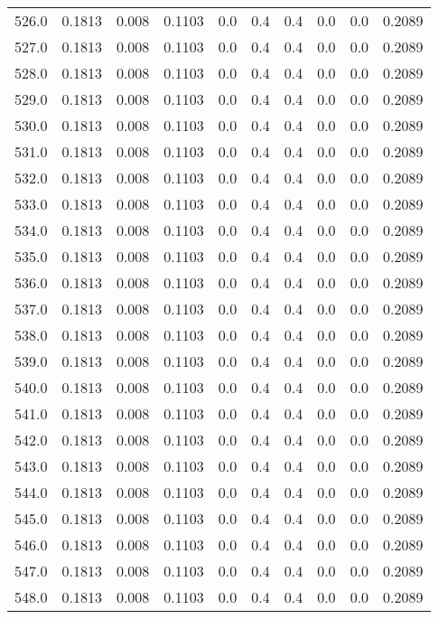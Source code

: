 \begin{longtable}{lrrrrrrrrr}
526.0 & 0.1813 & 0.008 & 0.1103 & 0.0 & 0.4 & 0.4 & 0.0 & 0.0 & 0.2089 \\
527.0 & 0.1813 & 0.008 & 0.1103 & 0.0 & 0.4 & 0.4 & 0.0 & 0.0 & 0.2089 \\
528.0 & 0.1813 & 0.008 & 0.1103 & 0.0 & 0.4 & 0.4 & 0.0 & 0.0 & 0.2089 \\
529.0 & 0.1813 & 0.008 & 0.1103 & 0.0 & 0.4 & 0.4 & 0.0 & 0.0 & 0.2089 \\
530.0 & 0.1813 & 0.008 & 0.1103 & 0.0 & 0.4 & 0.4 & 0.0 & 0.0 & 0.2089 \\
531.0 & 0.1813 & 0.008 & 0.1103 & 0.0 & 0.4 & 0.4 & 0.0 & 0.0 & 0.2089 \\
532.0 & 0.1813 & 0.008 & 0.1103 & 0.0 & 0.4 & 0.4 & 0.0 & 0.0 & 0.2089 \\
533.0 & 0.1813 & 0.008 & 0.1103 & 0.0 & 0.4 & 0.4 & 0.0 & 0.0 & 0.2089 \\
534.0 & 0.1813 & 0.008 & 0.1103 & 0.0 & 0.4 & 0.4 & 0.0 & 0.0 & 0.2089 \\
535.0 & 0.1813 & 0.008 & 0.1103 & 0.0 & 0.4 & 0.4 & 0.0 & 0.0 & 0.2089 \\
536.0 & 0.1813 & 0.008 & 0.1103 & 0.0 & 0.4 & 0.4 & 0.0 & 0.0 & 0.2089 \\
537.0 & 0.1813 & 0.008 & 0.1103 & 0.0 & 0.4 & 0.4 & 0.0 & 0.0 & 0.2089 \\
538.0 & 0.1813 & 0.008 & 0.1103 & 0.0 & 0.4 & 0.4 & 0.0 & 0.0 & 0.2089 \\
539.0 & 0.1813 & 0.008 & 0.1103 & 0.0 & 0.4 & 0.4 & 0.0 & 0.0 & 0.2089 \\
540.0 & 0.1813 & 0.008 & 0.1103 & 0.0 & 0.4 & 0.4 & 0.0 & 0.0 & 0.2089 \\
541.0 & 0.1813 & 0.008 & 0.1103 & 0.0 & 0.4 & 0.4 & 0.0 & 0.0 & 0.2089 \\
542.0 & 0.1813 & 0.008 & 0.1103 & 0.0 & 0.4 & 0.4 & 0.0 & 0.0 & 0.2089 \\
543.0 & 0.1813 & 0.008 & 0.1103 & 0.0 & 0.4 & 0.4 & 0.0 & 0.0 & 0.2089 \\
544.0 & 0.1813 & 0.008 & 0.1103 & 0.0 & 0.4 & 0.4 & 0.0 & 0.0 & 0.2089 \\
545.0 & 0.1813 & 0.008 & 0.1103 & 0.0 & 0.4 & 0.4 & 0.0 & 0.0 & 0.2089 \\
546.0 & 0.1813 & 0.008 & 0.1103 & 0.0 & 0.4 & 0.4 & 0.0 & 0.0 & 0.2089 \\
547.0 & 0.1813 & 0.008 & 0.1103 & 0.0 & 0.4 & 0.4 & 0.0 & 0.0 & 0.2089 \\
548.0 & 0.1813 & 0.008 & 0.1103 & 0.0 & 0.4 & 0.4 & 0.0 & 0.0 & 0.2089 \\

\end{longtable}
